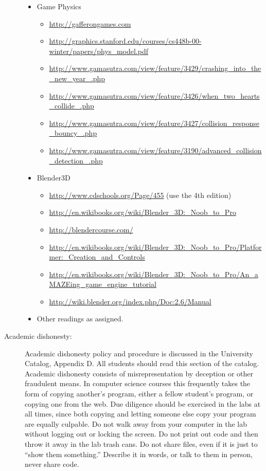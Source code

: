 \documentclass{article}
\begin{document}
\begin{description}
\begin{itemize}
\item{Game Physics}
\begin{itemize}
  \item \url{http://gafferongames.com}
\item \url{http://graphics.stanford.edu/courses/cs448b-00-winter/papers/phys_model.pdf}
\item 
\url{http://www.gamasutra.com/view/feature/3429/crashing_into_the_new_year_.php}
\item 
\url{http://www.gamasutra.com/view/feature/3426/when_two_hearts_collide_.php}
\item 
\url{http://www.gamasutra.com/view/feature/3427/collision_response_bouncy_.php}
\item 
\url{http://www.gamasutra.com/view/feature/3190/advanced_collision_detection_.php}

\end{itemize}

\item Blender3D
\begin{itemize}
\item \url{http://www.cdschools.org/Page/455} (use the 4th edition)
\item \url{http://en.wikibooks.org/wiki/Blender_3D:_Noob_to_Pro}
\item \url{http://blendercourse.com/}
\item \url{http://en.wikibooks.org/wiki/Blender_3D:_Noob_to_Pro/Platformer:_Creation_and_Controls}
\item \url{http://en.wikibooks.org/wiki/Blender_3D:_Noob_to_Pro/An_aMAZEing_game_engine_tutorial}
\item \url{http://wiki.blender.org/index.php/Doc:2.6/Manual}
\end{itemize}

\item Other readings as assigned.
\end{itemize}


\item [Academic dishonesty:] Academic dishonesty policy and
  procedure is discussed in the University Catalog, Appendix D.  All
  students should read this section of the catalog.  Academic
  dishonesty consists of misrepresentation by deception or other
  fraudulent means.  In computer science courses this frequently takes
  the form of copying another's program, either a fellow student's
  program, or copying one from the web.  Due diligence should be
  exercised in the labs at all times, since both copying and letting
  someone else copy your program are equally culpable.  Do not walk
  away from your computer in the lab without logging out or locking
  the screen.  Do not print out code and then throw it away in the lab
  trash cans. Do not share files, even if it is just to ``show them
  something.''  Describe it in words, or talk to them in person, never
  share code.


\end{description}
\end{document}
